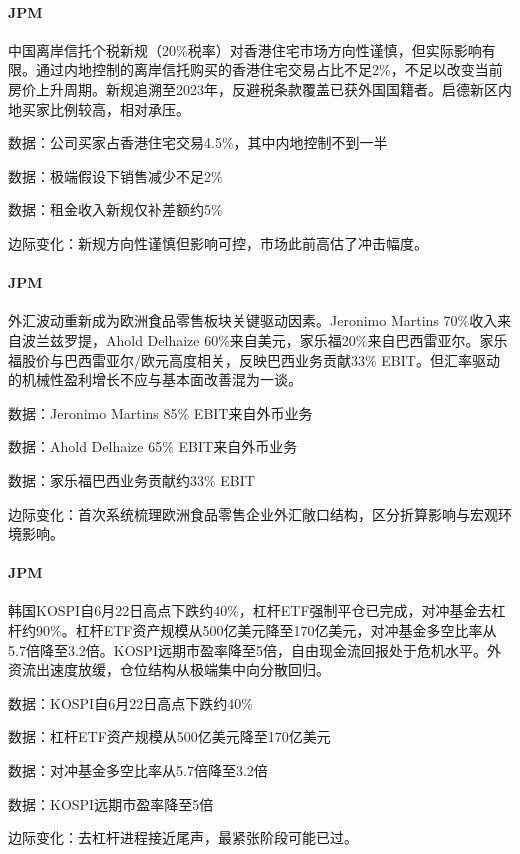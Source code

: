 \documentclass[11pt]{ctexart}
\begin{document}
\paragraph{JPM} 中国离岸信托个税新规（20\%税率）对香港住宅市场方向性谨慎，但实际影响有限。通过内地控制的离岸信托购买的香港住宅交易占比不足2\%，不足以改变当前房价上升周期。新规追溯至2023年，反避税条款覆盖已获外国国籍者。启德新区内地买家比例较高，相对承压。
{\small\color{refgray}数据：公司买家占香港住宅交易4.5\%，其中内地控制不到一半\par}
{\small\color{refgray}数据：极端假设下销售减少不足2\%\par}
{\small\color{refgray}数据：租金收入新规仅补差额约5\%\par}
{\small\color{refgray}边际变化：新规方向性谨慎但影响可控，市场此前高估了冲击幅度。\par}
\paragraph{JPM} 外汇波动重新成为欧洲食品零售板块关键驱动因素。Jeronimo Martins 70\%收入来自波兰兹罗提，Ahold Delhaize 60\%来自美元，家乐福20\%来自巴西雷亚尔。家乐福股价与巴西雷亚尔/欧元高度相关，反映巴西业务贡献33\% EBIT。但汇率驱动的机械性盈利增长不应与基本面改善混为一谈。
{\small\color{refgray}数据：Jeronimo Martins 85\% EBIT来自外币业务\par}
{\small\color{refgray}数据：Ahold Delhaize 65\% EBIT来自外币业务\par}
{\small\color{refgray}数据：家乐福巴西业务贡献约33\% EBIT\par}
{\small\color{refgray}边际变化：首次系统梳理欧洲食品零售企业外汇敞口结构，区分折算影响与宏观环境影响。\par}
\paragraph{JPM} 韩国KOSPI自6月22日高点下跌约40\%，杠杆ETF强制平仓已完成，对冲基金去杠杆约90\%。杠杆ETF资产规模从500亿美元降至170亿美元，对冲基金多空比率从5.7倍降至3.2倍。KOSPI远期市盈率降至5倍，自由现金流回报处于危机水平。外资流出速度放缓，仓位结构从极端集中向分散回归。
{\small\color{refgray}数据：KOSPI自6月22日高点下跌约40\%\par}
{\small\color{refgray}数据：杠杆ETF资产规模从500亿美元降至170亿美元\par}
{\small\color{refgray}数据：对冲基金多空比率从5.7倍降至3.2倍\par}
{\small\color{refgray}数据：KOSPI远期市盈率降至5倍\par}
{\small\color{refgray}边际变化：去杠杆进程接近尾声，最紧张阶段可能已过。\par}
\end{document}
